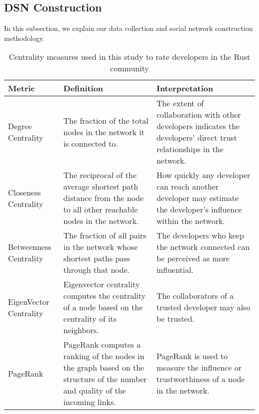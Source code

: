 \documentclass[10pt,journal,compsoc]{IEEEtran}
\begin{document}
\subsection{DSN Construction}
\label{dsn}

In this subsection, we explain our data collection and social network construction methodology.

\begin{table*}[]
    \centering
    \caption{Centrality measures used in this study to rate developers in the Rust community}
    \begin{tabular}{p{3cm}|p{5cm}|p{5cm}}
    \hline
        \textbf{Metric} & \textbf{Definition} & \textbf{Interpretation}  \\
        \hline
        Degree Centrality &  The fraction of the total nodes in the network it is connected to.   & The extent of collaboration with other  developers indicates the developers' direct trust relationships in the network. \\
        \hline
        Closeness Centrality & The reciprocal of the average shortest path distance from the node to all other reachable nodes in the network. & How quickly any developer can reach another developer may estimate the developer's influence within the network.\\
        \hline
        Betweenness Centrality  & The fraction of all pairs in the network whose shortest paths pass through that node.
        & The developers who keep the network connected can be perceived as more influential. \\
        \hline
        EigenVector Centrality & Eigenvector centrality computes the centrality of a node based on the centrality of its neighbors.  & The collaborators of a trusted developer may also be trusted.\\
        \hline
        PageRank & PageRank computes a ranking of the nodes in the graph based on the structure of the number and quality of the incoming links. & PageRank is used to measure the influence or trustworthiness of a node in the network.\\
        \hline
    \end{tabular}
    
    \label{tab:centralitymeasures}
\end{table*}
\end{document}
